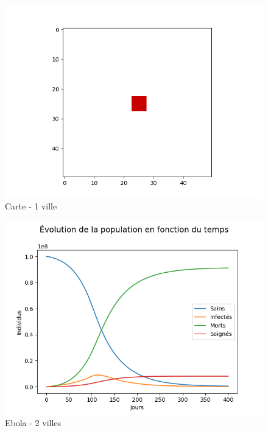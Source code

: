 \documentclass{article}
\begin{document}
\begin{figure}[H]
\caption{Carte - 1 ville}
\centering
\includegraphics[scale=0.8]{../images/carte_une_ville.png}
\end{figure}

\begin{figure}[H]
\caption{Ebola - 2 villes}
\centering
\includegraphics[scale=0.8]{../images/automate2_ebola_2villes_proba2.png}
\end{figure}
\end{document}
